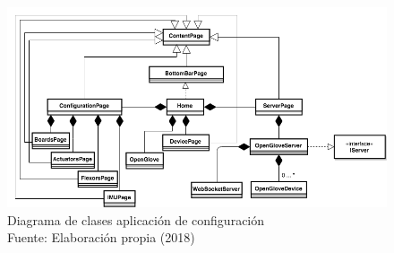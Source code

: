 \begin{figure}[H]
  \begin{center} 
   	\includegraphics[width=1.0\textwidth]{images/chapter04/OpenGlove-Architecture-Configuration-App.png} 
    \caption[Diagrama de clases aplicación de configuración]{Diagrama de clases aplicación de configuración \\Fuente: Elaboración propia (2018)}
    \label{fig:class-diagram-configuarion-app}
  \end{center}
\end{figure}
